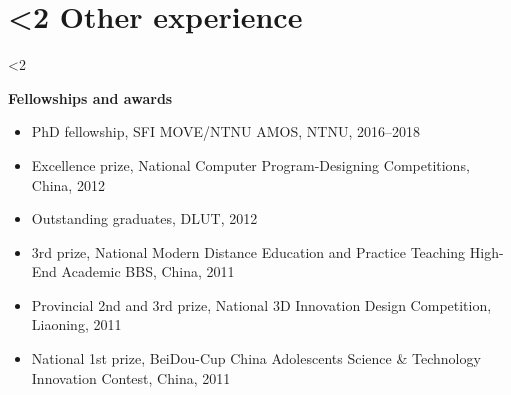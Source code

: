 \documentclass[10pt]{ctexart}
\begin{document}
\section*{\textbf{\ifnum\value{num}<2 {Other experience}  \fi}}
\ifnum\value{num}<2 {
    \textbf{Fellowships and awards}
    \begin{itemize}[label={}] \setlength\itemsep{0.5em}
    \item PhD fellowship, SFI MOVE/NTNU AMOS, NTNU, 2016--2018
    \item Excellence prize, National Computer Program-Designing Competitions, China, 2012
    \item Outstanding graduates, DLUT, 2012
    \item 3rd prize, National Modern Distance Education and Practice Teaching High-End Academic BBS, China, 2011
    \item Provincial 2nd and 3rd prize, National 3D Innovation Design Competition, Liaoning, 2011
    \item National 1st prize, BeiDou-Cup China Adolescents Science \& Technology Innovation Contest, China, 2011
    \end{itemize}
}\fi
\vspace*{0.5em}
\end{document}

